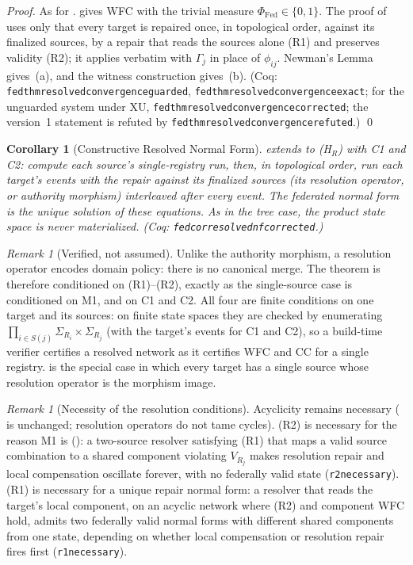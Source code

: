 \documentclass[11pt,a4paper]{article}
\theoremstyle{plain}
\newtheorem{corollary}[theorem]{Corollary}
\theoremstyle{definition}
\theoremstyle{remark}
\newtheorem{remark}[theorem]{Remark}
\newcommand{\Fed}{\mathrm{Fed}}
\renewcommand{\_}{\textunderscore\allowbreak}
\begin{document}
\begin{proof}
As for .   gives WFC
with the trivial measure $\Phi_\Fed \in \{0,1\}$.  The proof of
 uses only that every target is repaired once, in topological
order, against its finalized sources, by a repair that reads the sources alone
(R1) and preserves validity (R2); it applies verbatim with $\Gamma_j$ in place
of $\phi_{ij}$.  Newman's Lemma gives~(a), and the witness construction gives~(b).
(Coq: \texttt{fed\_thm\_resolved\_convergence\_guarded},
\texttt{fed\_thm\_resolved\_convergence\_exact}; for the unguarded system under
XU, \texttt{fed\_thm\_resolved\_convergence\_corrected}; the version~1
statement is refuted by \texttt{fed\_thm\_resolved\_convergence\_refuted}.) \qed
\end{proof}

\begin{corollary}[Constructive Resolved Normal Form]
\label{cor:resolved-nf}
 extends to (H$_R$) with C1 and C2: compute each source's
single-registry run, then, in topological order, run each target's events with
the repair against its finalized sources (its resolution operator, or authority
morphism) interleaved after every event.  The federated normal form is the
unique solution of these equations.  As in the tree case, the product state
space is never materialized.  (Coq: \texttt{fed\_cor\_resolved\_nf\_corrected}.)
\end{corollary}

\begin{remark}[Verified, not assumed]
Unlike the authority morphism, a resolution operator encodes domain policy:
there is no canonical merge.  The theorem is therefore conditioned on
(R1)--(R2), exactly as the single-source case is conditioned on M1, and on C1
and C2.  All four are finite conditions on one target and its sources: on
finite state spaces they are checked by enumerating
$\prod_{i \in S(j)} \Sigma_{R_i} \times \Sigma_{R_j}$ (with the target's events
for C1 and C2), so a build-time verifier certifies a resolved network as it
certifies WFC and CC for a single registry.   is the
special case in which every target has a single source whose resolution
operator is the morphism image.
\end{remark}

\begin{remark}[Necessity of the resolution conditions]
Acyclicity remains necessary ( is unchanged;
resolution operators do not tame cycles).  (R2) is necessary for the reason M1
is (): a two-source resolver satisfying (R1) that maps
a valid source combination to a shared component violating $V_{R_j}$ makes
resolution repair and local compensation oscillate forever, with no federally
valid state (\texttt{r2\_necessary}).  (R1) is necessary for a unique repair
normal form: a resolver that reads the target's local component, on an acyclic
network where (R2) and component WFC hold, admits two federally valid normal
forms with different shared components from one state, depending on whether
local compensation or resolution repair fires first (\texttt{r1\_necessary}).
\end{remark}
\end{document}
